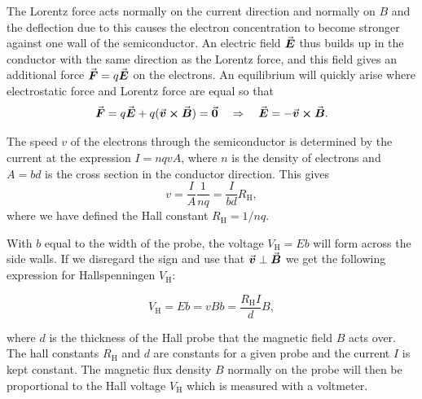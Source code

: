 \documentclass[../Elmag-labhefte-2020.tex]{subfiles}
\begin{document}
The Lorentz force acts normally on the current direction and normally on $B$ and the deflection due to this causes the electron concentration to become stronger against one wall of the semiconductor. An electric field $\va*{E}$ thus builds up in the conductor with the same direction as the Lorentz force, and this field gives an additional force $\va*{F} = q \va*{E}$ on the electrons. An equilibrium will quickly arise where electrostatic force and Lorentz force are equal so that
\begin{equation}
    \va*{F} =  q \va*{E} + q(\va*{v} \cross \va*{B}) = \va*{0}
    \quad \Rightarrow \quad
    \va*{E} = -\va*{v} \cross \va*{B} .
\end{equation}

The speed $v$ of the electrons through the semiconductor is determined by the current at the expression $I = nqvA$, where $n$ is the density of electrons and $A = bd$ is the cross section in the conductor direction. This gives
\begin{equation}
    v = \frac{I}{A} \frac{1}{nq} 
        = \frac{I}{bd} R_\text{H},
\end{equation}
where we have defined the Hall constant $R_\text{H} = 1/nq$.

With $b$ equal to the width of the probe, the voltage $V_\text{H} = E b$ will form across the side walls. If we disregard the sign and use that $\va*{v} \perp \va*{B}$ we get the following expression for Hallspenningen $V_\text{H}$:

\begin{equation}
    V_\text{H} = Eb
        =  vBb 
        = \frac{R_\text{H} I}{d} B,
    \label{eq:Hall}
\end{equation}

where $d$ is the thickness of the Hall probe that the magnetic field $B$ acts over. The hall constants $R_\text{H}$ and $d$ are constants for a given probe and the current $I$ is kept constant. The magnetic flux density $B$ normally on the probe will then be proportional to the Hall voltage $V_\text{H}$ which is measured with a voltmeter.
\end{document}
